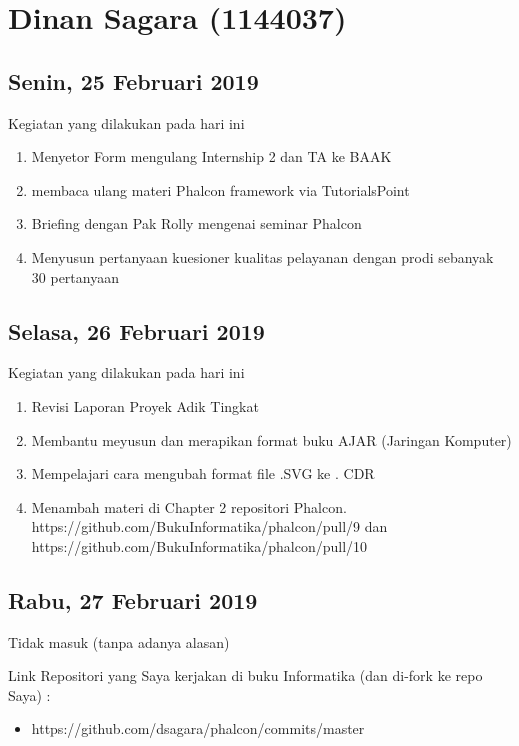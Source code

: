 \chapter{Dinan Sagara (1144037)}

\section{Senin, 25 Februari 2019}
Kegiatan yang dilakukan pada hari ini
\begin{enumerate}
\item Menyetor Form mengulang Internship 2 dan TA ke BAAK
\item membaca ulang materi Phalcon framework via TutorialsPoint
\item Briefing dengan Pak Rolly mengenai seminar Phalcon
\item Menyusun pertanyaan kuesioner kualitas pelayanan dengan prodi sebanyak 30 pertanyaan
\end{enumerate}

\section{Selasa, 26 Februari 2019}
Kegiatan yang dilakukan pada hari ini
\begin{enumerate}
\item Revisi Laporan Proyek Adik Tingkat
\item Membantu meyusun dan merapikan format buku AJAR (Jaringan Komputer)
\item Mempelajari cara mengubah format file .SVG ke . CDR
\item Menambah materi di Chapter 2 repositori Phalcon.
\subitem https://github.com/BukuInformatika/phalcon/pull/9 dan https://github.com/BukuInformatika/phalcon/pull/10
\end{enumerate}

\section{Rabu, 27 Februari 2019}
Tidak masuk (tanpa adanya alasan)

Link Repositori yang Saya kerjakan di buku Informatika (dan di-fork ke repo Saya) :
\begin{itemize}
\item https://github.com/dsagara/phalcon/commits/master
\end{itemize} 